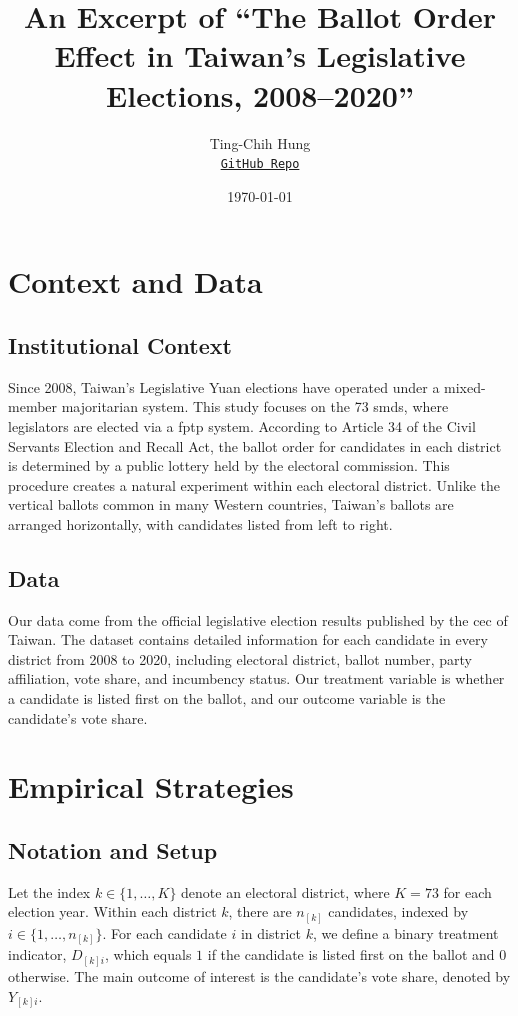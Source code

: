 \documentclass[10pt]{article}
\title{An Excerpt of ``The Ballot Order Effect in Taiwan's Legislative Elections, 2008--2020''}
\author{Ting-Chih Hung \\
  \faGithub\hspace{0.5em}\href{https://github.com/tchung697/ballot-order-effects}{\texttt{GitHub Repo}} 
}
\date{\today}
\theoremstyle{sfstyle}
\theoremstyle{remark}
\begin{document}
\maketitle

\setcounter{section}{1}

\section{Context and Data} \label{sec:context-data}

\subsection{Institutional Context}

Since 2008, 
Taiwan's Legislative Yuan elections 
have operated under a mixed-member majoritarian system. 
This study focuses on the 73 \glspl{smd},
where legislators are elected via a \gls{fptp} system. 
According to Article 34 of the Civil Servants Election and Recall Act, 
the ballot order for candidates in each district 
is determined by a public lottery held by the electoral commission.
This procedure creates a natural experiment within each electoral district. 
Unlike the vertical ballots common in many Western countries, 
Taiwan's ballots are arranged horizontally, 
with candidates listed from left to right.

\subsection{Data}

Our data come from the official legislative election results
published by the \gls{cec} of Taiwan.
The dataset contains detailed information
for each candidate in every district from 2008 to 2020,
including electoral district,
ballot number, party affiliation, 
vote share, and incumbency status.
Our treatment variable is whether a candidate is listed first on the ballot,
and our outcome variable is the candidate's vote share.

\section{Empirical Strategies}

\subsection{Notation and Setup}

Let the index $k \in \{1, \ldots, K\}$ denote an electoral district, 
where $K=73$ for each election year. 
Within each district $k$, 
there are $n_{[k]}$ candidates,
indexed by $i \in \{1, \ldots, n_{[k]}\}$. 
For each candidate $i$ in district $k$, 
we define a binary treatment indicator, $D_{[k]i}$, 
which equals $1$ if the candidate is listed first on the ballot 
and $0$ otherwise. 
The main outcome of interest is the candidate's vote share, 
denoted by $Y_{[k]i}$.
\end{document}
